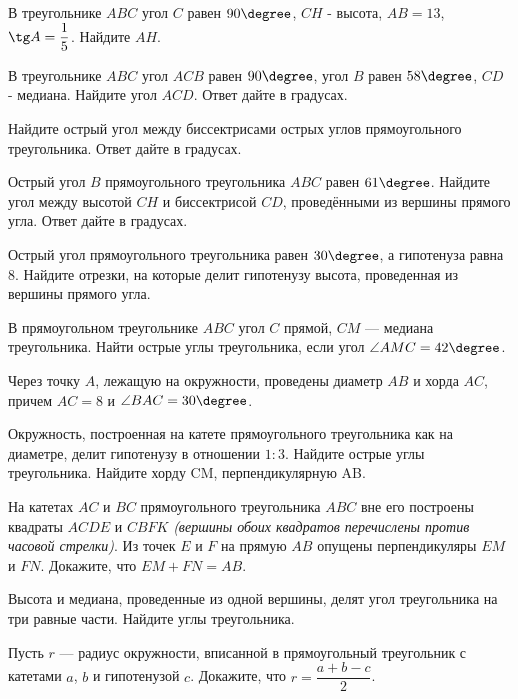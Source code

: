 \begin{class}[number=2]
	\begin{listofex}
		\item В треугольнике \( ABC \) угол \( C \) равен \( 90\degree \), \(CH\) - высота, \( AB = 13 \), \( \tg A = \dfrac{1}{5} \). Найдите \( AH \).
		\item В треугольнике \( ABC \) угол \( ACB \) равен \( 90\degree \), угол \( B \) равен \( 58 \degree \), \(CD\) - медиана. Найдите угол \( ACD \). Ответ дайте в градусах.
		\item Найдите острый угол между биссектрисами острых углов прямоугольного треугольника. Ответ дайте в градусах.
		\item Острый угол \( B\) прямоугольного треугольника \(ABC\) равен \(61 \degree\). Найдите угол между высотой \(CH\) и биссектрисой \(CD\), проведёнными из вершины прямого угла. Ответ дайте в градусах.
		\item Острый угол прямоугольного треугольника равен \( 30\degree \), а гипотенуза равна \( 8 \). Найдите отрезки, на которые делит гипотенузу высота, проведенная из вершины прямого угла.
		\item В прямоугольном треугольнике \( ABC \) угол \( C \) прямой, \( CM \) --- медиана треугольника. Найти острые углы треугольника, если угол \( \angle AMC = 42\degree \).
		\item Через точку \( A \), лежащую на окружности, проведены диаметр \( AB \) и хорда \( AC \), причем \( AC = 8 \) и \( \angle BAC = 30\degree \).
		\item Окружность, построенная на катете прямоугольного треугольника как на диаметре, делит гипотенузу в отношении \( 1 : 3 \). Найдите острые углы треугольника.
		Найдите хорду CM, перпендикулярную AB.
		\item На катетах \( AC \) и \( BC \) прямоугольного треугольника \( ABC \) вне его построены квадраты \( ACDE \) и \( CBFK \) \textit{(вершины обоих квадратов перечислены против часовой стрелки)}. Из точек \( E \) и \( F \) на прямую \( AB \) опущены перпендикуляры \( EM \) и \( FN \). Докажите, что \( EM + FN = AB \).
		\item Высота и медиана, проведенные из одной вершины, делят угол треугольника на три равные части. Найдите углы треугольника.
		\item Пусть \( r \) --- радиус окружности, вписанной в прямоугольный треугольник с катетами \( a \), \( b \) и гипотенузой \( c \). Докажите, что \( r=\dfrac{a+b-c}{2} \).
	\end{listofex}
\end{class}

